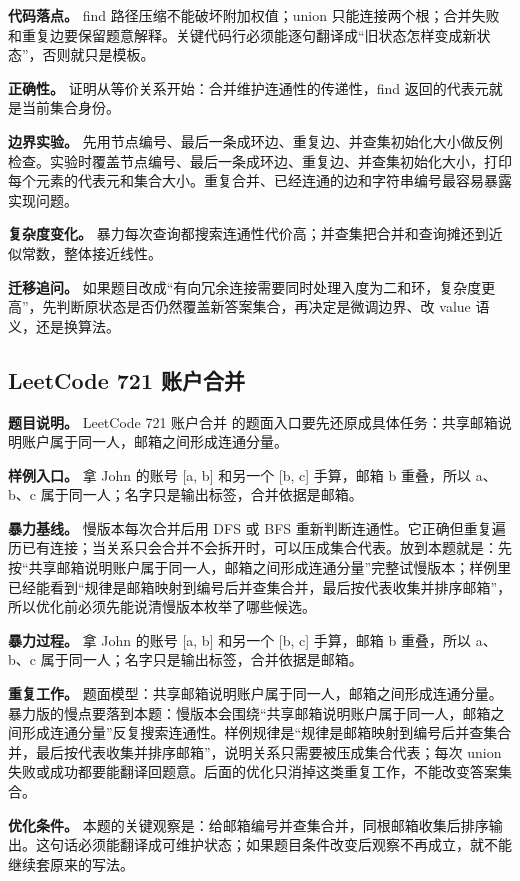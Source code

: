 \textbf{代码落点。} find 路径压缩不能破坏附加权值；union 只能连接两个根；合并失败和重复边要保留题意解释。关键代码行必须能逐句翻译成“旧状态怎样变成新状态”，否则就只是模板。

\textbf{正确性。} 证明从等价关系开始：合并维护连通性的传递性，find 返回的代表元就是当前集合身份。

\textbf{边界实验。} 先用节点编号、最后一条成环边、重复边、并查集初始化大小做反例检查。实验时覆盖节点编号、最后一条成环边、重复边、并查集初始化大小，打印每个元素的代表元和集合大小。重复合并、已经连通的边和字符串编号最容易暴露实现问题。

\textbf{复杂度变化。} 暴力每次查询都搜索连通性代价高；并查集把合并和查询摊还到近似常数，整体接近线性。

\textbf{迁移追问。} 如果题目改成“有向冗余连接需要同时处理入度为二和环，复杂度更高”，先判断原状态是否仍然覆盖新答案集合，再决定是微调边界、改 value 语义，还是换算法。

\subsection{LeetCode 721 账户合并}

\textbf{题目说明。} LeetCode 721 账户合并 的题面入口要先还原成具体任务：共享邮箱说明账户属于同一人，邮箱之间形成连通分量。

\textbf{样例入口。} 拿 John 的账号 [a, b] 和另一个 [b, c] 手算，邮箱 b 重叠，所以 a、b、c 属于同一人；名字只是输出标签，合并依据是邮箱。

\textbf{暴力基线。} 慢版本每次合并后用 DFS 或 BFS 重新判断连通性。它正确但重复遍历已有连接；当关系只会合并不会拆开时，可以压成集合代表。放到本题就是：先按“共享邮箱说明账户属于同一人，邮箱之间形成连通分量”完整试慢版本；样例里已经能看到“规律是邮箱映射到编号后并查集合并，最后按代表收集并排序邮箱”，所以优化前必须先能说清慢版本枚举了哪些候选。

\textbf{暴力过程。} 拿 John 的账号 [a, b] 和另一个 [b, c] 手算，邮箱 b 重叠，所以 a、b、c 属于同一人；名字只是输出标签，合并依据是邮箱。

\textbf{重复工作。} 题面模型：共享邮箱说明账户属于同一人，邮箱之间形成连通分量。暴力版的慢点要落到本题：慢版本会围绕“共享邮箱说明账户属于同一人，邮箱之间形成连通分量”反复搜索连通性。样例规律是“规律是邮箱映射到编号后并查集合并，最后按代表收集并排序邮箱”，说明关系只需要被压成集合代表；每次 union 失败或成功都要能翻译回题意。后面的优化只消掉这类重复工作，不能改变答案集合。

\textbf{优化条件。} 本题的关键观察是：给邮箱编号并查集合并，同根邮箱收集后排序输出。这句话必须能翻译成可维护状态；如果题目条件改变后观察不再成立，就不能继续套原来的写法。


